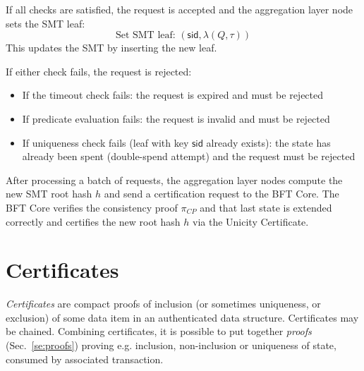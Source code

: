 If all checks are satisfied, the request is accepted and the aggregation layer node sets the SMT leaf:
\[
\text{Set SMT leaf: } (\mathsf{sid}, \lambda(Q,\tau))
\]
This updates the SMT by inserting the new leaf.

If either check fails, the request is rejected:
\begin{itemize}
	\item If the timeout check fails: the request is expired and must be rejected
	\item If predicate evaluation fails: the request is invalid and must be rejected
	\item If uniqueness check fails (leaf with key $\mathsf{sid}$ already exists): the state has already been spent (double-spend attempt) and the request must be rejected
\end{itemize}

After processing a batch of requests, the aggregation layer nodes compute the new SMT root hash $h$ and send a certification request to the BFT Core. The BFT Core verifies the consistency proof $\pi_{CP}$ and that last state is extended correctly and certifies the new root hash $h$ via the Unicity Certificate.


\section{Certificates}

\emph{Certificates} are compact proofs of inclusion (or sometimes uniqueness, or exclusion) of some data item in an authenticated data structure. Certificates may be chained. Combining certificates, it is possible to put together \emph{proofs} (Sec.~\ref{se:proofs}) proving e.g. inclusion, non-inclusion or uniqueness of state, consumed by associated transaction.

